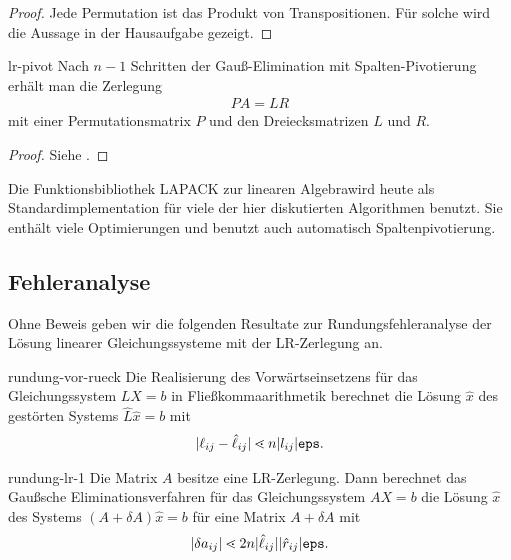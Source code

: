 \begin{proof}
  Jede Permutation ist das Produkt von Transpositionen. Für solche
  wird die Aussage in der Hausaufgabe gezeigt.
\end{proof}

\begin{Satz}{lr-pivot}
  Nach $n-1$ Schritten der Gauß-Elimination mit Spalten-Pivotierung
  erhält man die Zerlegung
  \begin{gather}
    PA = LR
  \end{gather}
  mit einer Permutationsmatrix $P$ und den Dreiecksmatrizen $L$ und $R$.
\end{Satz}

\begin{proof}
  Siehe \cite[Abschnitt 1.3]{DeuflhardHohmann08}.
\end{proof}

\begin{remark}
  Die Funktionsbibliothek LAPACK zur linearen Algebrawird heute als
  Standardimplementation für viele der hier diskutierten Algorithmen
  benutzt. Sie enthält viele Optimierungen und benutzt auch
  automatisch Spaltenpivotierung.
\end{remark}

\subsection{Fehleranalyse}

Ohne Beweis geben wir die folgenden Resultate zur
Rundungsfehleranalyse der Lösung linearer
Gleichungssysteme mit der LR-Zerlegung an.

\begin{Lemma}{rundung-vor-rueck}
  Die Realisierung des Vorwärtseinsetzens für das Gleichungssystem
  $LX = b$ in Fließkommaarithmetik berechnet die Lösung $\hat x$ des
  gestörten Systems $\hat L \hat x = b$ mit
  \begin{gather}
    \lvert\ell_{ij} - \hat\ell_{ij}\rvert
    \lessdot n \lvert l_{ij}\rvert \texttt{eps}.
  \end{gather}
\end{Lemma}

\begin{Lemma}{rundung-lr-1}
  Die Matrix $A$ besitze eine LR-Zerlegung. Dann berechnet das
  Gaußsche Eliminationsverfahren für das Gleichungssystem $AX=b$ die
  Lösung $\hat x$ des Systems $(A+\delta A) \hat x = b$ für eine Matrix
  $A+\delta A$ mit
  \begin{gather}
    \lvert\delta a_{ij}\rvert \lessdot 2n \lvert\hat \ell_{ij}\rvert
    \lvert\hat r_{ij}\rvert\texttt{eps}.
  \end{gather}
\end{Lemma}

